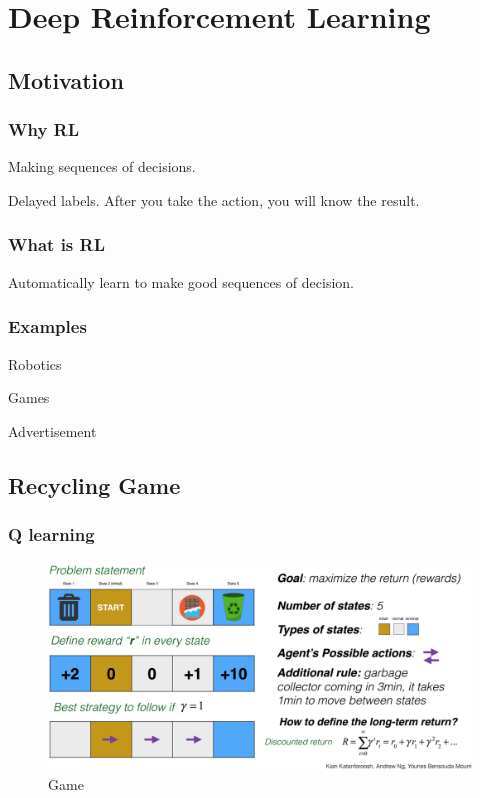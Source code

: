 \newpage{}
\section{Deep Reinforcement Learning}


\subsection{Motivation}
\subsubsection{Why RL}
Making sequences of decisions.

Delayed labels. After you take the action, you will know the result.


\subsubsection{What is RL}
Automatically learn to make good sequences of decision.


\subsubsection{Examples}
Robotics

Games

Advertisement


\subsection{Recycling Game}
\subsubsection{Q learning}
\begin{figure}[h!] %
	\centering
	\includegraphics[width=1.0\linewidth]{img/recycling_game_0.png}
	\caption{Game}\label{img:recycling_game_0}
\end{figure}

